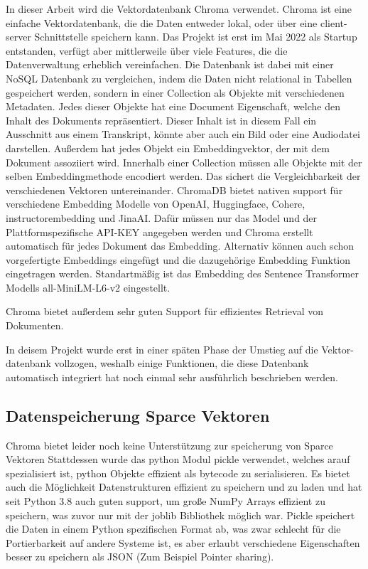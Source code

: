 In dieser Arbeit wird die Vektordatenbank Chroma verwendet. 
Chroma ist eine einfache Vektordatenbank, die die Daten entweder lokal, oder über eine client-server Schnittstelle speichern kann.
Das Projekt ist erst im Mai 2022 als Startup entstanden, verfügt aber mittlerweile über viele Features, die die Datenverwaltung erheblich vereinfachen.
Die Datenbank ist dabei mit einer NoSQL Datenbank zu vergleichen, indem die Daten nicht relational in Tabellen gespeichert werden, sondern in einer Collection als Objekte mit verschiedenen Metadaten.
Jedes dieser Objekte hat eine Document Eigenschaft, welche den Inhalt des Dokuments repräsentiert.
Dieser Inhalt ist in diesem Fall ein Ausschnitt aus einem Transkript, könnte aber auch ein Bild oder eine Audiodatei darstellen.
Außerdem hat jedes Objekt ein Embeddingvektor, der mit dem Dokument assoziiert wird. 
Innerhalb einer Collection müssen alle Objekte mit der selben Embeddingmethode encodiert werden.
Das sichert die Vergleichbarkeit der verschiedenen Vektoren untereinander.
ChromaDB bietet nativen support für verschiedene Embedding Modelle von OpenAI, Huggingface, Cohere, instructorembedding und JinaAI.
Dafür müssen nur das Model und der Plattformspezifische API-KEY angegeben werden und Chroma erstellt automatisch für jedes Dokument das Embedding.
Alternativ können auch schon vorgefertigte Embeddings eingefügt und die dazugehörige Embedding Funktion eingetragen werden.
Standartmäßig ist das Embedding des Sentence Transformer Modells all-MiniLM-L6-v2 eingestellt.

Chroma bietet außerdem sehr guten Support für effizientes Retrieval von Dokumenten.
 


In deisem Projekt wurde erst in einer späten Phase der Umstieg auf die Vektor-datenbank vollzogen, weshalb einige Funktionen, die diese Datenbank automatisch integriert hat noch einmal sehr ausführlich beschrieben werden.




\subsection{Datenspeicherung Sparce Vektoren}

Chroma bietet leider noch keine Unterstützung zur speicherung von Sparce Vektoren
Stattdessen wurde das python Modul pickle verwendet, welches arauf spezialisiert ist, python Objekte effizient als bytecode zu serialisieren. 
Es bietet auch die Möglichkeit Datenstrukturen effizient zu speichern und zu laden und hat seit Python 3.8 auch guten support, um große NumPy Arrays effizient zu speichern, was zuvor nur mit der joblib Bibliothek möglich war.
Pickle speichert die Daten in einem Python spezifischen Format ab, was zwar schlecht für die Portierbarkeit auf andere Systeme ist, es aber erlaubt verschiedene Eigenschaften besser zu speichern als JSON (Zum Beispiel Pointer sharing).

